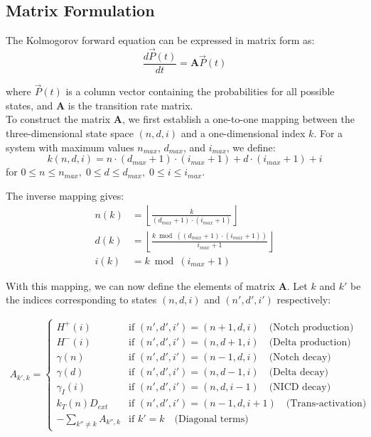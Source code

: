 \documentclass{article}
\begin{document}
\begin{flushleft}
\subsection*{Matrix Formulation}
The Kolmogorov forward equation can be expressed in matrix form as:
\[
\frac{d\vec{P}(t)}{dt} = \mathbf{A} \vec{P}(t)
\]

where $\vec{P}(t)$ is a column vector containing the probabilities for all possible states, and $\mathbf{A}$ is the transition rate matrix. \\

To construct the matrix $\mathbf{A}$, we first establish a one-to-one mapping between the three-dimensional state space $(n,d,i)$ and a one-dimensional index $k$. For a system with maximum values $n_{max}$, $d_{max}$, and $i_{max}$, we define:
\[
k(n,d,i) = n \cdot (d_{max}+1) \cdot (i_{max}+1) + d \cdot (i_{max}+1) + i
\]
for $0 \leq n \leq n_{max}, \; 0 \leq d \leq d_{max}, \; 0 \leq i \leq i_{max}$.

The inverse mapping gives:
\begin{align*}
n(k) &= \left\lfloor \frac{k}{(d_{max}+1) \cdot (i_{max}+1)} \right\rfloor \\
d(k) &= \left\lfloor \frac{k \bmod ((d_{max}+1) \cdot (i_{max}+1))}{i_{max}+1} \right\rfloor \\
i(k) &= k \bmod (i_{max}+1)
\end{align*}

With this mapping, we can now define the elements of matrix $\mathbf{A}$. Let $k$ and $k'$ be the indices corresponding to states $(n,d,i)$ and $(n',d',i')$ respectively:

\begin{align*}
A_{k',k} = 
\begin{cases}
H^+(i) & \text{if } (n',d',i') = (n+1,d,i) \quad \text{(Notch production)} \\
H^-(i) & \text{if } (n',d',i') = (n,d+1,i) \quad \text{(Delta production)} \\
\gamma(n) & \text{if } (n',d',i') = (n-1,d,i) \quad \text{(Notch decay)} \\
\gamma(d) & \text{if } (n',d',i') = (n,d-1,i) \quad \text{(Delta decay)} \\
\gamma_I(i) & \text{if } (n',d',i') = (n,d,i-1) \quad \text{(NICD decay)} \\
k_T(n)D_{ext} & \text{if } (n',d',i') = (n-1,d,i+1) \quad \text{(Trans-activation)} \\
-\sum_{k'' \neq k} A_{k'',k} & \text{if } k' = k \quad \text{(Diagonal terms)}
\end{cases}
\end{align*}


\end{flushleft}
\end{document}
